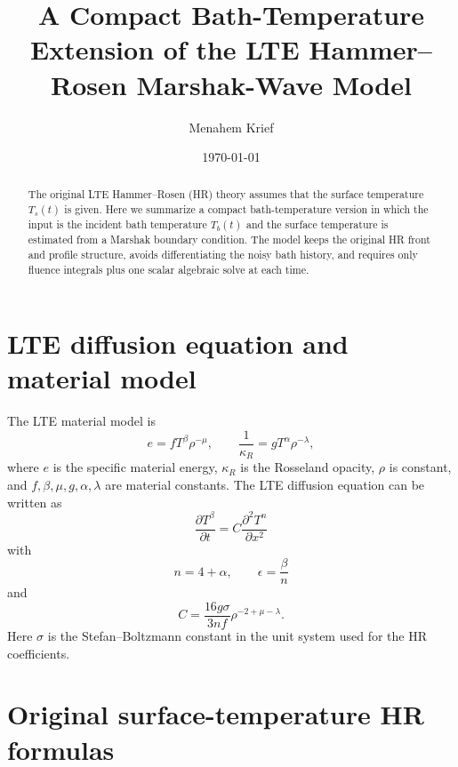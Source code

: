 \documentclass[11pt]{article}
\title{A Compact Bath-Temperature Extension of the LTE Hammer--Rosen Marshak-Wave Model}
\author{Menahem Krief}
\date{\today}
\newcommand{\Tb}{T_b}
\newcommand{\Ts}{T_s}
\newcommand{\eps}{\epsilon}
\begin{document}
\maketitle

\begin{abstract}
The original LTE Hammer--Rosen (HR) theory assumes that the surface temperature
$\Ts(t)$ is given.  Here we summarize a compact bath-temperature version in
which the input is the incident bath temperature $\Tb(t)$ and the surface
temperature is estimated from a Marshak boundary condition.  The model keeps
the original HR front and profile structure, avoids differentiating the noisy
bath history, and requires only fluence integrals plus one scalar algebraic
solve at each time.
\end{abstract}

\section{LTE diffusion equation and material model}

The LTE material model is
\begin{equation}
 e=fT^\beta\rho^{-\mu},
 \qquad
 \frac{1}{\kappa_R}=gT^\alpha\rho^{-\lambda},
 \label{eq:material}
\end{equation}
where $e$ is the specific material energy, $\kappa_R$ is the Rosseland opacity,
$\rho$ is constant, and $f,\beta,\mu,g,\alpha,\lambda$ are material constants.
The LTE diffusion equation can be written as
\begin{equation}
 \boxed{
 \frac{\partial T^\beta}{\partial t}
 =C\frac{\partial^2 T^n}{\partial x^2}}
 \label{eq:lte_diffusion}
\end{equation}
with
\begin{equation}
 \boxed{n=4+\alpha,\qquad \eps=\frac{\beta}{n}}
 \label{eq:n_eps}
\end{equation}
and
\begin{equation}
 \boxed{
 C=\frac{16g\sigma}{3nf}\rho^{-2+\mu-\lambda}.}
 \label{eq:C}
\end{equation}
Here $\sigma$ is the Stefan--Boltzmann constant in the unit system used for the
HR coefficients.

\section{Original surface-temperature HR formulas}
\end{document}
